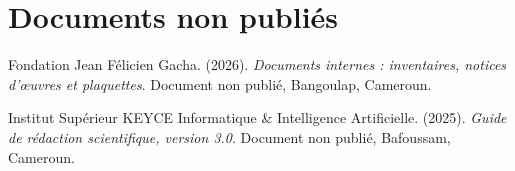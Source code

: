 \section*{Documents non publiés}

\begin{apalist}
\item Fondation Jean Félicien Gacha. (2026). \emph{Documents internes :
      inventaires, notices d'œuvres et plaquettes}. Document non publié,
      Bangoulap, Cameroun.

\item Institut Supérieur KEYCE Informatique \& Intelligence Artificielle.
      (2025). \emph{Guide de rédaction scientifique, version 3.0}. Document non
      publié, Bafoussam, Cameroun.
\end{apalist}
